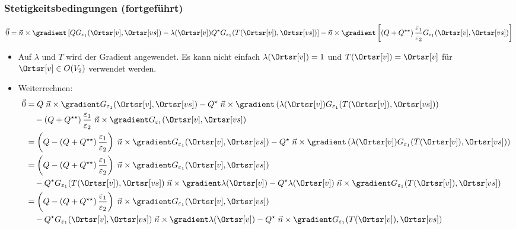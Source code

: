    \begin{frame}
     \frametitle{Stetigkeitsbedingungen (fortgeführt)}
     \begin{equation*}
       \vec{0}= \vec{n}\times \gradient \left[ Q G_{\varepsilon_1}(\Ortsr[v], \Ortsr[vs]) - \lambda(\Ortsr[v]) Q^\star G_{\varepsilon_1}(T(\Ortsr[v]), \Ortsr[vs]) \right]
        - \vec{n}\times \gradient \left[ \left( Q +  Q^{\star\star}\right) \frac{\varepsilon_1}{\varepsilon_2} G_{\varepsilon_1}(\Ortsr[v], \Ortsr[vs]) \right]
       \end{equation*}
      \begin{itemize}[<+->]
      \item Auf $\lambda$ und $T$ wird der Gradient angewendet. Es kann nicht einfach $\lambda(\Ortsr[v])=1$ und $T(\Ortsr[v])=\Ortsr[v]$ für $\Ortsr[v]\in O(V_2)$ verwendet werden.
      \item Weiterrechnen:
        \begin{align*}
          \vec{0} &= Q \; \vec{n}\times \gradient G_{\varepsilon_1}(\Ortsr[v], \Ortsr[vs]) - Q^\star\; \vec{n}\times\gradient\left( \lambda(\Ortsr[v]) G_{\varepsilon_1}(T(\Ortsr[v]), \Ortsr[vs]) \right)\\
            &\quad - \left( Q +  Q^{\star\star}\right) \frac{\varepsilon_1}{\varepsilon_2}\; \vec{n}\times \gradient  G_{\varepsilon_1}(\Ortsr[v], \Ortsr[vs]) \\
            &= \left( Q  - \left( Q +  Q^{\star\star}\right) \frac{\varepsilon_1}{\varepsilon_2} \right)\; \vec{n}\times \gradient G_{\varepsilon_1}(\Ortsr[v], \Ortsr[vs]) - Q^\star\; \vec{n}\times\gradient\left( \lambda(\Ortsr[v]) G_{\varepsilon_1}(T(\Ortsr[v]), \Ortsr[vs]) \right)\\
            &= \left( Q  - \left( Q +  Q^{\star\star}\right) \frac{\varepsilon_1}{\varepsilon_2} \right)\; \vec{n}\times \gradient G_{\varepsilon_1}(\Ortsr[v], \Ortsr[vs])  \\
            &\quad - Q^\star G_{\varepsilon_1}(T(\Ortsr[v]), \Ortsr[vs])\; \vec{n}\times\gradient \lambda(\Ortsr[v]) - Q^\star\lambda(\Ortsr[v]) \; \vec{n}\times\gradient G_{\varepsilon_1}(T(\Ortsr[v]), \Ortsr[vs]) \\
          &= \left( Q  - \left( Q +  Q^{\star\star}\right) \frac{\varepsilon_1}{\varepsilon_2} \right)\; \vec{n}\times \gradient G_{\varepsilon_1}(\Ortsr[v], \Ortsr[vs])  \\
          &\quad - Q^\star G_{\varepsilon_1}(\Ortsr[v], \Ortsr[vs])\; \vec{n}\times\gradient \lambda(\Ortsr[v]) - Q^\star \; \vec{n}\times\gradient G_{\varepsilon_1}(T(\Ortsr[v]), \Ortsr[vs])
        \end{align*}
 \end{itemize}
      \end{frame}


